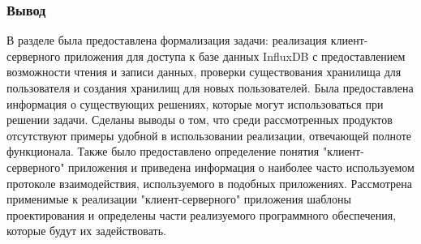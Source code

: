 \subsubsection*{Вывод}
В разделе была предоставлена формализация задачи: реализация клиент-серверного приложения для доступа к базе данных InfluxDB с предоставлением возможности чтения и записи данных, проверки существования хранилища для пользователя и создания хранилищ для новых пользователей.
Была предоставлена информация о существующих решениях, которые могут использоваться при решении задачи. Сделаны выводы о том, что среди рассмотренных продуктов отсутствуют примеры удобной в использовании реализации, отвечающей полноте функционала.
Также было предоставлено определение понятия "клиент-серверного" приложения и приведена информация о наиболее часто используемом протоколе взаимодействия, используемого в подобных приложениях. Рассмотрена применимые к реализации "клиент-серверного" приложения шаблоны проектирования и определены части реализуемого программного обеспечения, которые будут их задействовать.

\pagebreak